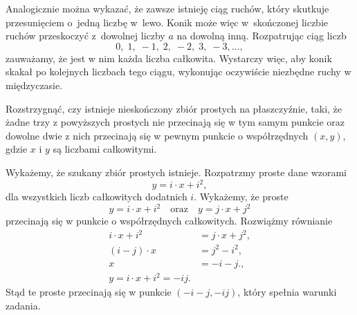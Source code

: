 \vspace{10px}
\noindent
Analogicznie można wykazać, że zawsze istnieję ciąg ruchów, który skutkuje przesunięciem o~jedną liczbę w~lewo. Konik może więc w~skończonej liczbie ruchów przeskoczyć z~dowolnej liczby $a$ na dowolną inną. Rozpatrując ciąg liczb
\[
	0, \; 1, \; -1, \; 2, \; -2, \; 3, \; -3, ...,
\]
zauważamy, że jest w nim każda liczba całkowita. Wystarczy więc, aby konik skakał po kolejnych liczbach tego ciągu, wykonując oczywiście niezbędne ruchy w międzyczasie.

\begin{problem}{6}
	Rozstrzygnąć, czy istnieje nieskończony zbiór prostych na płaszczyźnie, taki, że żadne trzy z powyższych prostych nie przecinają się w tym samym punkcie oraz dowolne dwie z nich przecinają się w pewnym punkcie o współrzędnych $(x, y)$, gdzie $x$ i $y$ są liczbami całkowitymi.
\end{problem}

\noindent
Wykażemy, że szukany zbiór prostych istnieje.
Rozpatrzmy proste dane wzorami
\[
	y = i \cdot x + i^2,
\]
dla wszystkich liczb całkowitych dodatnich $i$. Wykażemy, że proste
\[
	y = i \cdot x + i^2 \quad \text{oraz} \quad y = j \cdot x + j^2
\]
przecinają się w punkcie o współrzędnych całkowitych. Rozwiążmy równianie
\begin{align*}
	i \cdot x + i^2 &= j \cdot x + j^2, \\
	(i - j) \cdot x &= j^2 - i^2, \\
	x &= - i - j.
	, \\
	y = i \cdot x + i^2 = -ij.
\end{align*} 
Stąd te proste przecinają się w punkcie $(-i - j, -ij)$, który spełnia warunki zadania.

